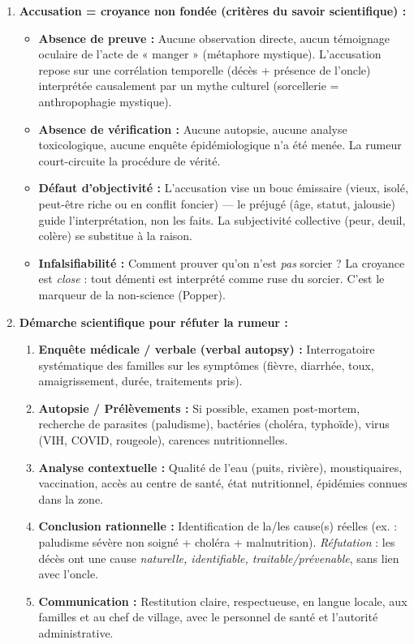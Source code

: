 \documentclass[11pt]{article}
\newcommand{\cle}[1]{{\popxbold\color{popdark}#1}}
\begin{document}
\begin{corrige}
\begin{enumerate}
\item \textbf{Accusation = croyance non fondée (critères du savoir scientifique) :}
\begin{itemize}
\item \textbf{Absence de preuve :} Aucune \cle{observation directe}, aucun \cle{témoignage oculaire} de l'acte de « manger » (métaphore mystique). L'accusation repose sur une \cle{corrélation temporelle} (décès + présence de l'oncle) interprétée causalement par un \cle{mythe culturel} (sorcellerie = anthropophagie mystique).
\item \textbf{Absence de vérification :} Aucune \cle{autopsie}, aucune \cle{analyse toxicologique}, aucune \cle{enquête épidémiologique} n'a été menée. La rumeur court-circuite la procédure de vérité.
\item \textbf{Défaut d'objectivité :} L'accusation vise un \cle{bouc émissaire} (vieux, isolé, peut-être riche ou en conflit foncier) — le \cle{préjugé} (âge, statut, jalousie) guide l'interprétation, non les faits. La \cle{subjectivité} collective (peur, deuil, colère) se substitue à la \cle{raison}.
\item \textbf{Infalsifiabilité :} Comment prouver qu'on n'est \emph{pas} sorcier ? La croyance est \emph{close} : tout démenti est interprété comme ruse du sorcier. C'est le marqueur de la \cle{non-science} (Popper).
\end{itemize}

\item \textbf{Démarche scientifique pour réfuter la rumeur :}
\begin{enumerate}
\item \textbf{Enquête médicale / verbale (verbal autopsy) :} Interrogatoire systématique des familles sur les symptômes (fièvre, diarrhée, toux, amaigrissement, durée, traitements pris).
\item \textbf{Autopsie / Prélèvements :} Si possible, examen post-mortem, recherche de parasites (paludisme), bactéries (choléra, typhoïde), virus (VIH, COVID, rougeole), carences nutritionnelles.
\item \textbf{Analyse contextuelle :} Qualité de l'eau (puits, rivière), moustiquaires, vaccination, accès au centre de santé, état nutritionnel, épidémies connues dans la zone.
\item \textbf{Conclusion rationnelle :} Identification de la/les cause(s) réelles (ex. : paludisme sévère non soigné + choléra + malnutrition). \emph{Réfutation} : les décès ont une cause \emph{naturelle, identifiable, traitable/prévenable}, sans lien avec l'oncle.
\item \textbf{Communication :} Restitution claire, respectueuse, en langue locale, aux familles et au chef de village, avec le personnel de santé et l'autorité administrative.
\end{enumerate}


\end{enumerate}
\end{corrige}
\end{document}
